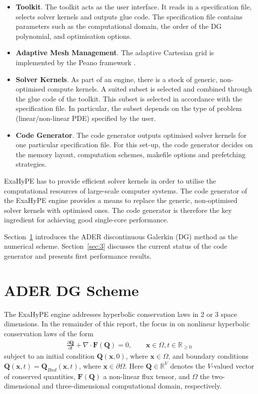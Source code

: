 \documentclass{acm_proc_article-sp}
\begin{document}
\begin{itemize}
\item \textbf{Toolkit}. The toolkit acts as the user interface. It reads in a specification file, selects solver kernels and outputs glue code. The specification file contains parameters such as the computational domain, the order of the DG polynomial, and optimisation options. %
\item \textbf{Adaptive Mesh Management}. The adaptive Cartesian grid is implemented by the Peano framework \cite{Software:Peano}.
\item \textbf{Solver Kernels}. As part of an engine, there is a stock of generic, non-optimised compute kernels. A suited subset is selected and combined through the glue code of the toolkit. This subset is selected in accordance with the specification file. In particular, the subset depends on the type of problem (linear/non-linear PDE) specified by the user.
\item \textbf{Code Generator}. The code generator outputs optimised solver kernels for one particular specification file. For this set-up, the code generator decides on the memory layout, computation schemes, makefile options and prefetching strategies. 
\end{itemize}

ExaHyPE has to provide efficient solver kernels in order to utilise the computational resources of large-scale computer systems. The code generator of the ExaHyPE engine provides a means to replace the generic, non-optimised solver kernels with optimised ones. The code generator is therefore the key ingredient for achieving good single-core performance. 


Section~\ref{sec:math} introduces the ADER discontinuous Galerkin (DG) method as the numerical scheme. Section~\ref{sec:3} discusses the current status of the code generator and presents first performance results. 

\section{ADER DG Scheme}\label{sec:math}
The ExaHyPE engine addresses hyperbolic conservation laws in 2 or 3 space dimensions. In the remainder of this report, the focus in on nonlinear hyperbolic conservation laws of the form
\begin{align}\frac{\partial \mathbf{Q}}{\partial t} + \nabla \cdot \mathbf{F}(\mathbf{Q}) = 0, \qquad \mathbf{x}\in \Omega, t \in \mathbb{R}_{\geq 0}\label{eq:pde}\end{align}
subject to an initial condition $\mathbf{Q}(\mathbf{x},0)$, where $\mathbf{x}\in \Omega$, and boundary conditions $\mathbf{Q}(\mathbf{x},t) = \mathbf{Q}_{Bnd}(\mathbf{x},t)$, where $\mathbf{x}\in \partial \Omega$. Here $\mathbf{Q}\in \mathbb{R}^{V}$ denotes the $V$-valued vector of conserved quantities, $\mathbf{F}(\mathbf{Q})$ a non-linear flux tensor, and $\Omega$ the two-dimensional and three-dimensional computational domain, respectively. 
\end{document}
